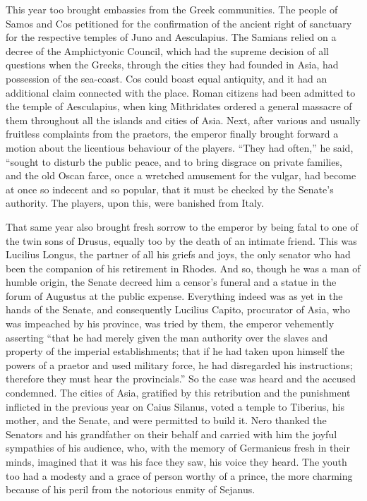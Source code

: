 
This year too brought embassies from the Greek communities. The people of Samos and Cos petitioned for the confirmation of the ancient right of sanctuary for the respective temples of Juno and Aesculapius. The Samians relied on a decree of the Amphictyonic Council, which had the supreme decision of all questions when the Greeks, through the cities they had founded in Asia, had possession of the sea-coast. Cos could boast equal antiquity, and it had an additional claim connected with the place. Roman citizens had been admitted to the temple of Aesculapius, when king Mithridates ordered a general massacre of them throughout all the islands and cities of Asia. Next, after various and usually fruitless complaints from the praetors, the emperor finally brought forward a motion about the licentious behaviour of the players. ``They had often,'' he said, ``sought to disturb the public peace, and to bring disgrace on private families, and the old Oscan farce, once a wretched amusement for the vulgar, had become at once so indecent and so popular, that it must be checked by the Senate's authority. The players, upon this, were banished from Italy.


That same year also brought fresh sorrow to the emperor by being fatal to one of the twin sons of Drusus, equally too by the death of an intimate friend. This was Lucilius Longus, the partner of all his griefs and joys, the only senator who had been the companion of his retirement in Rhodes. And so, though he was a man of humble origin, the Senate decreed him a censor's funeral and a statue in the forum of Augustus at the public expense. Everything indeed was as yet in the hands of the Senate, and consequently Lucilius Capito, procurator of Asia, who was impeached by his province, was tried by them, the emperor vehemently asserting ``that he had merely given the man authority over the slaves and property of the imperial establishments; that if he had taken upon himself the powers of a praetor and used military force, he had disregarded his instructions; therefore they must hear the provincials.'' So the case was heard and the accused condemned. The cities of Asia, gratified by this retribution and the punishment inflicted in the previous year on Caius Silanus, voted a temple to Tiberius, his mother, and the Senate, and were permitted to build it. Nero thanked the Senators and his grandfather on their behalf and carried with him the joyful sympathies of his audience, who, with the memory of Germanicus fresh in their minds, imagined that it was his face they saw, his voice they heard. The youth too had a modesty and a grace of person worthy of a prince, the more charming because of his peril from the notorious enmity of Sejanus.

